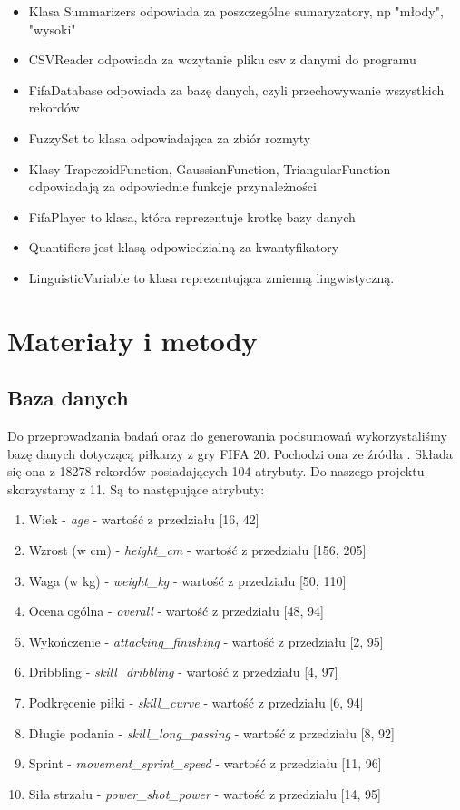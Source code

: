 \documentclass{classrep}
\begin{document}
	\begin{itemize}
		\item Klasa Summarizers odpowiada za poszczególne sumaryzatory, np "młody", "wysoki" 
		\item CSVReader odpowiada za wczytanie pliku csv z danymi do programu
		\item FifaDatabase odpowiada za bazę danych, czyli przechowywanie wszystkich rekordów
		\item FuzzySet to klasa odpowiadająca za zbiór rozmyty
		\item Klasy TrapezoidFunction, GaussianFunction, TriangularFunction odpowiadają za odpowiednie funkcje przynależności
		\item FifaPlayer to klasa, która reprezentuje krotkę bazy danych
		\item Quantifiers jest klasą odpowiedzialną za kwantyfikatory
		\item LinguisticVariable to klasa reprezentująca zmienną lingwistyczną.
	\end{itemize}
	
	\section{Materiały i metody} %
	\subsection{Baza danych}
	Do przeprowadzania badań oraz do generowania podsumowań wykorzystaliśmy bazę danych dotyczącą piłkarzy z gry FIFA 20. Pochodzi ona ze źródła \cite{baza}. Składa się ona z 18278 rekordów posiadających 104 atrybuty. Do naszego projektu skorzystamy z 11. Są to następujące atrybuty:
	
	\begin{enumerate}
		\item Wiek - \textsl{age} - wartość z przedziału [16, 42]
		\item Wzrost (w cm) - \textsl{height\_cm} - wartość z przedziału [156, 205]
		\item Waga (w kg) - \textsl{weight\_kg} - wartość z przedziału [50, 110]
		\item Ocena ogólna - \textsl{overall} - wartość z przedziału [48, 94]
		\item Wykończenie - \textsl{attacking\_finishing} - wartość z przedziału [2, 95]
		\item Dribbling - \textsl{skill\_dribbling} - wartość z przedziału [4, 97]
		\item Podkręcenie piłki - \textsl{skill\_curve} - wartość z przedziału [6, 94]
		\item Długie podania - \textsl{skill\_long\_passing} - wartość z przedziału [8, 92]
		\item Sprint - \textsl{movement\_sprint\_speed} - wartość z przedziału [11, 96]
		\item Siła strzału - \textsl{power\_shot\_power} - wartość z przedziału [14, 95]
	\end{enumerate}
\end{document}
